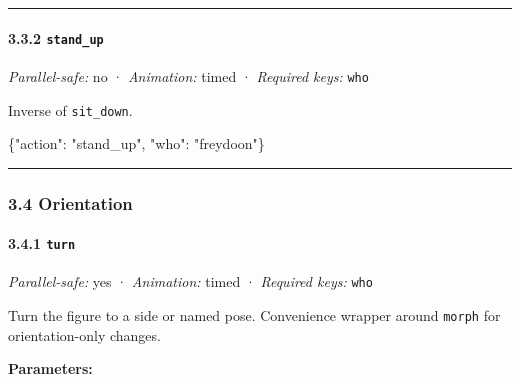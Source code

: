 \documentclass[
  11pt,
]{book}
\newenvironment{Shaded}{}{}
\newcommand{\DataTypeTok}[1]{\textcolor[rgb]{0.56,0.13,0.00}{#1}}
\newcommand{\FunctionTok}[1]{\textcolor[rgb]{0.02,0.16,0.49}{#1}}
\newcommand{\StringTok}[1]{\textcolor[rgb]{0.25,0.44,0.63}{#1}}
\begin{document}
\begin{center}\rule{0.5\linewidth}{0.5pt}\end{center}

\paragraph{\texorpdfstring{3.3.2
\texttt{stand\_up}}{3.3.2 stand\_up}}\label{stand_up}

\emph{Parallel-safe:} no · \emph{Animation:} timed · \emph{Required
keys:} \texttt{who}

Inverse of \texttt{sit\_down}.

\begin{Shaded}
\begin{Highlighting}[]
\FunctionTok{\{}\DataTypeTok{"action"}\FunctionTok{:} \StringTok{"stand\_up"}\FunctionTok{,} \DataTypeTok{"who"}\FunctionTok{:} \StringTok{"freydoon"}\FunctionTok{\}}
\end{Highlighting}
\end{Shaded}

\begin{center}\rule{0.5\linewidth}{0.5pt}\end{center}

\subsubsection{3.4 Orientation}\label{orientation}

\paragraph{\texorpdfstring{3.4.1 \texttt{turn}}{3.4.1 turn}}\label{turn}

\emph{Parallel-safe:} yes · \emph{Animation:} timed · \emph{Required
keys:} \texttt{who}

Turn the figure to a side or named pose. Convenience wrapper around
\texttt{morph} for orientation-only changes.

\textbf{Parameters:}
\end{document}
